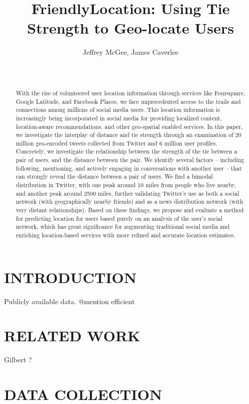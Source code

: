 \documentclass{sig-alternate}
\title{FriendlyLocation: Using Tie Strength to Geo-locate Users
}
\author{
    \alignauthor Jeffrey McGee, James Caverlee\\
    \affaddr{Department of Computer Science and Engineering, Texas A\&M
    University} \\
    \affaddr{ College Station, TX 77845 USA} \\
    \email{jeffamcgee@tamu.edu, caverlee@cse.tamu.edu}
}
\begin{document}
\maketitle
\begin{abstract}
With the rise of volunteered user location information through services like
Foursquare, Google Latitude, and Facebook Places, we face unprecedented access
to the trails and connections among millions of social media users. This
location information is increasingly being incorporated in social media for
providing localized content, location-aware recommendations, and other
geo-spatial enabled services. In this paper, we investigate the interplay of
distance and tie strength through an examination of 20 million geo-encoded
tweets collected from Twitter and 6 million user profiles. Concretely, we
investigate the relationship between the strength of the tie between a pair of
users, and the distance between the pair. We identify several factors --
including following, mentioning, and actively engaging in conversations with
another user -- that can strongly reveal the distance between a pair of users.
We find a bimodal distribution in Twitter, with one peak around 10 miles from
people who live nearby, and another peak around 2500 miles, further validating
Twitter's use as both a social network (with geographically nearby friends) and
as a news distribution network (with very distant relationships). Based on
these findings, we propose and evaluate a method for predicting location for
users based purely on an analysis of the user's social network, which has great
significance for augmenting traditional social media and enriching
location-based services with more refined and accurate location estimates.

\end{abstract}




\section{INTRODUCTION}


Publicly available data.
@mention
efficient

\section{RELATED WORK}
\cite{scellato2011socio}
\cite{scellato2010distance}
\cite{backstrom2010find}
\cite{cheng2010you}
Gilbert ?


\section{DATA COLLECTION}
\end{document}
